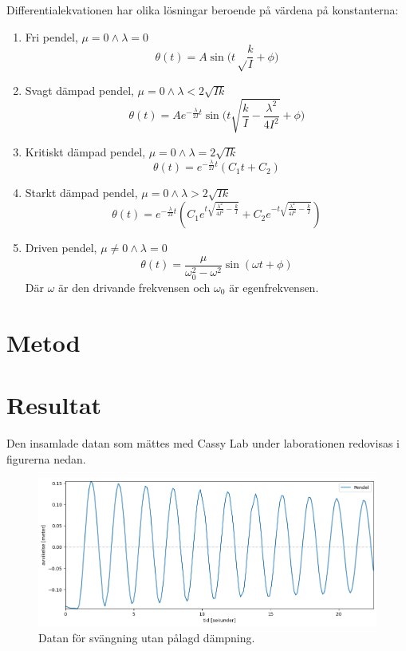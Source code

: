 \documentclass[12pt, a4paper]{article}
\begin{document}
Differentialekvationen har olika lösningar beroende på värdena på konstanterna:
\begin{enumerate}
    \item Fri pendel, $\mu=0\land\lambda=0$
    \begin{equation}\label{eq:fri_pendel}
        \theta(t)=A\sin\biggl(t\sqrt\frac{k}{I}+\phi\biggr)
    \end{equation}
    \item Svagt dämpad pendel, $\mu=0\land\lambda<2\sqrt{Ik}$
    \begin{equation}\label{eq:svagt_dämpad}
        \theta(t)=Ae^{-\frac{\lambda}{2I}t}\sin\biggl(t\sqrt{\frac{k}{I}-\frac{\lambda^2}{4I^2}}+\phi\biggr)
    \end{equation}
    \item Kritiskt dämpad pendel, $\mu=0\land\lambda=2\sqrt{Ik}$
    \begin{equation}
        \theta(t)=e^{-\frac{\lambda}{2I}t}\left(C_1t+C_2\right)
    \end{equation}
    \item Starkt dämpad pendel, $\mu=0\land\lambda>2\sqrt{Ik}$
    \begin{equation}\label{eq:starkt_dämpad}
        \theta(t)=e^{-\frac{\lambda}{2I}t}\left(C_1e^{t\sqrt{\frac{\lambda^2}{4I^2}-\frac{k}{I}}}+C_2e^{-t\sqrt{\frac{\lambda^2}{4I^2}-\frac{k}{I}}}\right)
    \end{equation}
    \item Driven pendel, $\mu\neq0\land\lambda=0$
    \begin{equation}
        \theta(t)=\frac{\mu}{\omega_0^2-\omega^2}\sin\left(\omega t+\phi\right)
    \end{equation}
    Där $\omega$ är den drivande frekvensen och $\omega_0$ är egenfrekvensen.
\end{enumerate}
\section{Metod}

\section{Resultat}
Den insamlade datan som mättes med Cassy Lab under laborationen redovisas i figurerna nedan. 

\begin{figure}[hp]
    \includegraphics[width=\textwidth]{graf_egenfrekvens}
    \caption{Datan för svängning utan pålagd dämpning.}
    \label{fig:data_egenfrekvens}
\end{figure}
\end{document}
